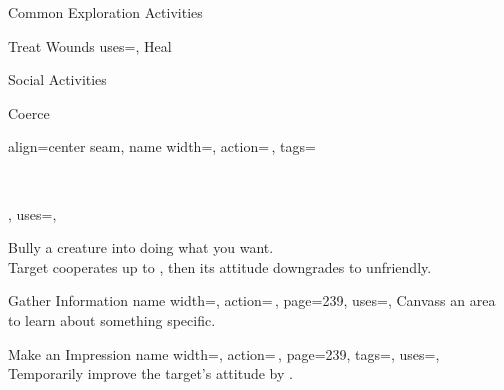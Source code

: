 \begin{PageFrontLandscape}
\begin{TablesHalf}{\frontTableHeight}
\begin{Table}{Common Exploration Activities}
\begin{entry}{Treat Wounds}
{                uses=\Medicine,
            }
                Heal  \hfill
                 \hfill
                \\\hfill
                \Ts\DC[15] \quad
                \E\DC[20] \quad
                \M\DC[30]  \quad
                \Le\DC[40] \hfill
            \end{entry}
        \end{Table}
        \TableSpace
        \begin{Table}{Social Activities}
            \begin{entry}{Coerce}{%
                align=center seam,
                name width=\activityLength,%
                action=\,,
                tags=\parbox{0.5\linewidth}{\raggedleft{}\,\Concentrate\\\Auditory\Linguistic},
                uses=\InitimidationWill,
            }
                Bully a creature into doing what you want.\\
                Target cooperates up to , then its attitude downgrades to unfriendly. \hfill
                \\
                \hfill
            \end{entry}
            \begin{entry}{Gather Information}{%
                name width=\activityLength,%
                action=\,,
                page=239,
                uses={\Diplomacy[tags={S}]},
            }
                Canvass an area to learn about something specific.\hfill
            \end{entry}
            \begin{entry}{Make an Impression}{%
                name width=\activityLength,%
                action=\,,
                page=239,
                tags=\kern-0.5pt\Mental\Concentrate,
                uses=\DiplomacyWill,
            }
                Temporarily improve the target's attitude by .

\end{entry}
\end{Table}
\end{TablesHalf}
\end{PageFrontLandscape}
